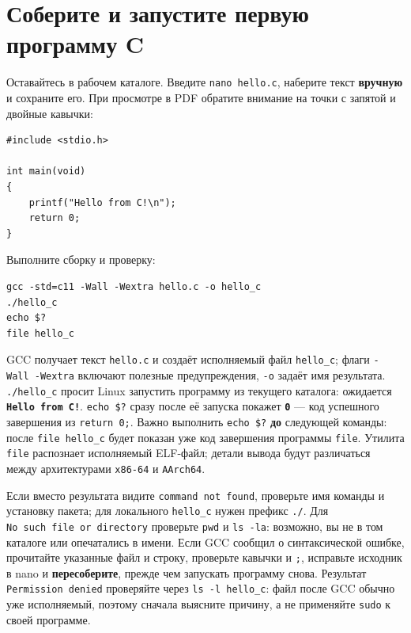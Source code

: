 \hypertarget{ux441ux43eux431ux435ux440ux438ux442ux435-ux438-ux437ux430ux43fux443ux441ux442ux438ux442ux435-ux43fux435ux440ux432ux443ux44e-ux43fux440ux43eux433ux440ux430ux43cux43cux443-c}{%
\section{Соберите и запустите первую программу
C}\label{ux441ux43eux431ux435ux440ux438ux442ux435-ux438-ux437ux430ux43fux443ux441ux442ux438ux442ux435-ux43fux435ux440ux432ux443ux44e-ux43fux440ux43eux433ux440ux430ux43cux43cux443-c}}

Оставайтесь в рабочем каталоге. Введите \texttt{nano\ hello.c}, наберите
текст \textbf{вручную} и сохраните его. При просмотре в PDF обратите
внимание на точки с запятой и двойные кавычки:

\begin{verbatim}
#include <stdio.h>

int main(void)
{
    printf("Hello from C!\n");
    return 0;
}
\end{verbatim}

Выполните сборку и проверку:

\begin{verbatim}
gcc -std=c11 -Wall -Wextra hello.c -o hello_c
./hello_c
echo $?
file hello_c
\end{verbatim}

GCC получает текст \texttt{hello.c} и создаёт исполняемый файл
\texttt{hello\_c}; флаги \texttt{-Wall\ -Wextra} включают полезные
предупреждения, \texttt{-o} задаёт имя результата. \texttt{./hello\_c}
просит Linux запустить программу из текущего каталога: ожидается
\textbf{\texttt{Hello\ from\ C!}}. \texttt{echo\ \$?} сразу после её
запуска покажет \textbf{\texttt{0}} --- код успешного завершения из
\texttt{return\ 0;}. Важно выполнить \texttt{echo\ \$?} \textbf{до}
следующей команды: после \texttt{file\ hello\_c} будет показан уже код
завершения программы \texttt{file}. Утилита \texttt{file} распознает
исполняемый ELF-файл; детали вывода будут различаться между
архитектурами \texttt{x86-64} и \texttt{AArch64}.

Если вместо результата видите \texttt{command\ not\ found}, проверьте
имя команды и установку пакета; для локального \texttt{hello\_c} нужен
префикс \texttt{./}. Для \texttt{No\ such\ file\ or\ directory}
проверьте \texttt{pwd} и \texttt{ls\ -la}: возможно, вы не в том
каталоге или опечатались в имени. Если GCC сообщил о синтаксической
ошибке, прочитайте указанные файл и строку, проверьте кавычки и
\texttt{;}, исправьте исходник в nano и \textbf{пересоберите}, прежде
чем запускать программу снова. Результат \texttt{Permission\ denied}
проверяйте через \texttt{ls\ -l\ hello\_c}: файл после GCC обычно уже
исполняемый, поэтому сначала выясните причину, а не применяйте
\texttt{sudo} к своей программе.

